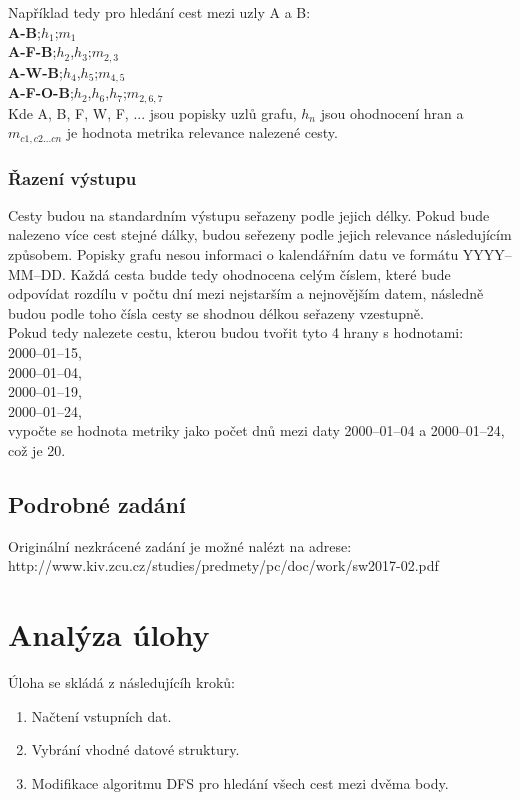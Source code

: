 Například tedy pro hledání cest mezi uzly A a B:\\

\textbf{A-B};$h_{1}$;$m_{1}$\\
\textbf{A-F-B};$h_{2}$,$h_{3}$;$m_{2,3}$\\
\textbf{A-W-B};$h_{4}$,$h_{5}$;$m_{4,5}$\\
\textbf{A-F-O-B};$h_{2}$,$h_{6}$,$h_{7}$;$m_{2,6,7}$\\


Kde A, B, F, W, F, ... jsou popisky uzlů grafu, $h_{n}$ jsou ohodnocení hran a $m_{c1,c2...cn}$ je hodnota metrika relevance nalezené cesty.

\subsection{Řazení výstupu}
Cesty budou na standardním výstupu seřazeny podle jejich délky. Pokud bude nalezeno více cest stejné dálky, budou seřezeny podle jejich relevance následujícím způsobem. Popisky grafu nesou informaci o kalendářním datu ve formátu YYYY--MM--DD. Každá cesta budde tedy ohodnocena celým číslem, které bude odpovídat rozdílu v počtu dní mezi nejstarším a nejnovějším datem, následně budou podle toho čísla cesty se shodnou délkou seřazeny vzestupně.\\

Pokud tedy nalezete cestu, kterou budou tvořit tyto 4 hrany s hodnotami:\\

2000--01--15,\\
2000--01--04,\\
2000--01--19,\\
2000--01--24,\\

vypočte se hodnota metriky jako počet dnů mezi daty 2000--01--04 a 2000--01--24, což je 20.

\section{Podrobné zadání}
Originální nezkrácené zadání je možné nalézt na adrese:\\

http://www.kiv.zcu.cz/studies/predmety/pc/doc/work/sw2017-02.pdf

\setcounter{page}{1}

\chapter{Analýza úlohy}
Úloha se skládá z následujícíh kroků:
\begin{enumerate}
	\item Načtení vstupních dat.
	\item Vybrání vhodné datové struktury.
	\item Modifikace algoritmu DFS pro hledání všech cest mezi dvěma body.
\end{enumerate}

